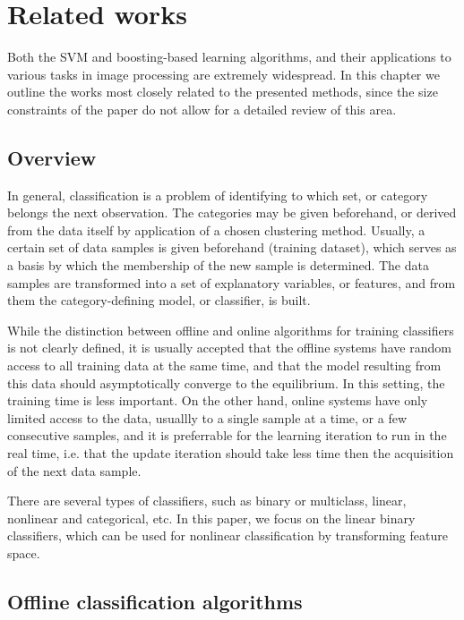 \ifpdf
    \graphicspath{{2/figures/PNG/}{2/figures/PDF/}{2/figures/}}
\else
    \graphicspath{{2/figures/EPS/}{2/figures/}}
\fi
\chapter{Related works} %
\label{Chap2}
Both the SVM and boosting-based learning algorithms, and their applications to various tasks in image processing are extremely widespread. In this chapter we outline the works most closely related to the presented methods, since the size constraints of the paper do not allow for a detailed review of this area. 
\section{Overview}
In general, classification is a problem of identifying to which set, or category belongs the next observation. The categories may be given beforehand, or derived from the data itself by application of a chosen clustering method. Usually, a certain set of data samples is given beforehand (training dataset), which serves as a basis by which the membership of the new sample is determined. The data samples are transformed into a set of explanatory variables, or features, and from them the category-defining model, or classifier, is built.

While the distinction between offline and online algorithms for training classifiers is not clearly defined, it is usually accepted that the offline systems have random access to all training data at the same time, and that the model resulting from this data should asymptotically converge to the equilibrium. In this setting, the training time is less important.  On the other hand, online systems have only limited access to the data, usuallly to a single sample at a time, or a few consecutive samples, and it is preferrable for the learning iteration to run in the real time, i.e. that the update iteration should take less time then the acquisition of the next data sample. 

There are several types of classifiers, such as binary or multiclass, linear, nonlinear and categorical, etc. In this paper, we focus on the linear binary classifiers, which can be used for nonlinear classification by transforming feature space. 
\section{Offline classification algorithms}

